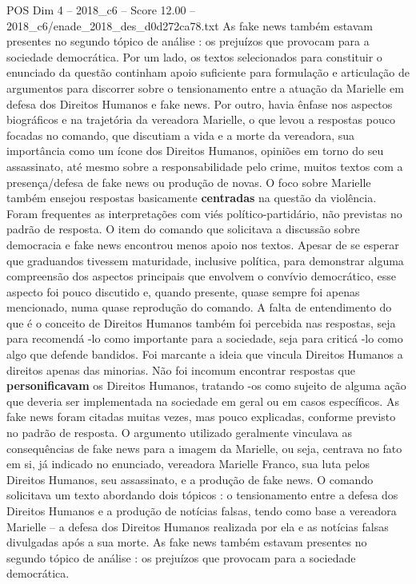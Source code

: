 \begin{textsample}{POS Dim 4 – 2018\_c6 – Score 12.00 – 2018\_c6/enade\_2018\_des\_d0d272ca78.txt}
As fake news também estavam presentes no segundo tópico de análise : os prejuízos que provocam para a sociedade democrática.
Por um lado, os textos selecionados para constituir o enunciado da questão continham apoio suficiente para formulação e articulação de argumentos para discorrer sobre o tensionamento entre a atuação da Marielle em defesa dos Direitos Humanos e fake news.
Por outro, havia ênfase nos aspectos biográficos e na trajetória da vereadora Marielle, o que levou a respostas pouco focadas no comando, que discutiam a vida e a morte da vereadora, sua importância como um ícone dos Direitos Humanos, opiniões em torno do seu assassinato, até mesmo sobre a responsabilidade pelo crime, muitos textos com a presença/defesa de fake news ou produção de novas.
O foco sobre Marielle também ensejou respostas basicamente \textbf{centradas} na questão da violência.
Foram frequentes as interpretações com viés político-partidário, não previstas no padrão de resposta.
O item do comando que solicitava a discussão sobre democracia e fake news encontrou menos apoio nos textos.
Apesar de se esperar que graduandos tivessem maturidade, inclusive política, para demonstrar alguma compreensão dos aspectos principais que envolvem o convívio democrático, esse aspecto foi pouco discutido e, quando presente, quase sempre foi apenas mencionado, numa quase reprodução do comando.
A falta de entendimento do que é o conceito de Direitos Humanos também foi percebida nas respostas, seja para recomendá -lo como importante para a sociedade, seja para criticá -lo como algo que defende bandidos.
Foi marcante a ideia que vincula Direitos Humanos a direitos apenas das minorias.
Não foi incomum encontrar respostas que \textbf{personificavam} os Direitos Humanos, tratando -os como sujeito de alguma ação que deveria ser implementada na sociedade em geral ou em casos específicos.
As fake news foram citadas muitas vezes, mas pouco explicadas, conforme previsto no padrão de resposta.
O argumento utilizado geralmente vinculava as consequências de fake news para a imagem da Marielle, ou seja, centrava no fato em si, já indicado no enunciado, vereadora Marielle Franco, sua luta pelos Direitos Humanos, seu assassinato, e a produção de fake news.
O comando solicitava um texto abordando dois tópicos : o tensionamento entre a defesa dos Direitos Humanos e a produção de notícias falsas, tendo como base a vereadora Marielle – a defesa dos Direitos Humanos realizada por ela e as notícias falsas divulgadas após a sua morte.
As fake news também estavam presentes no segundo tópico de análise : os prejuízos que provocam para a sociedade democrática.

\end{textsample}
